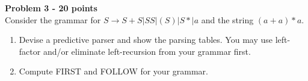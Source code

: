 \documentclass[a4paper, 11pt]{article}
\newenvironment{problem}[2][Problem]
    { \begin{mdframed}[backgroundcolor=gray!20] \textbf{#1 #2} \\}
    {  \end{mdframed}}
\begin{document}

\begin{problem}{3 - 20 points}
Consider the grammar for $S  \longrightarrow S + S | SS | (S) | S * | a $ and the string $(a + a)* a$. 

\begin{enumerate}[a]
    \item Devise a predictive parser and show the parsing tables. You may use left-factor and/or eliminate left-recursion from your grammar first.
    \item Compute FIRST and FOLLOW for your grammar. 
\end{enumerate}

\end{problem}
\end{document}
